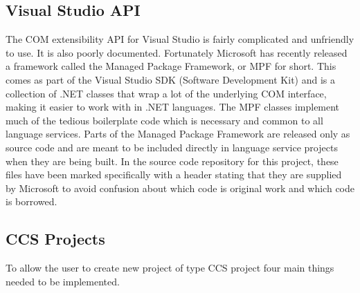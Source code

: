 	\subsection{Visual Studio API}	
	The COM extensibility API for Visual Studio is fairly complicated and 
	unfriendly to use. It is also poorly documented. Fortunately Microsoft has 
	recently released a framework called the Managed Package Framework, or MPF 
	for short. This comes as part of the Visual Studio SDK (Software Development 
	Kit) and is a collection of .NET classes that wrap a lot of the underlying 
	COM interface, making it easier to work with in .NET languages. 
	The MPF classes implement much of the tedious boilerplate code which is 
	necessary and common to all language services. Parts of the Managed Package 
	Framework are released only as source code and are meant to be included 
	directly in language service projects when they are being built. In the 
	source code repository for this project, these files have been marked 
	specifically with a header stating that they are supplied by Microsoft to 
	avoid confusion about which code is original work and which code is 
	borrowed. 

	\subsection{CCS Projects}
	To allow the user to create new project of type CCS project four main things 
	needed to be implemented.
	
